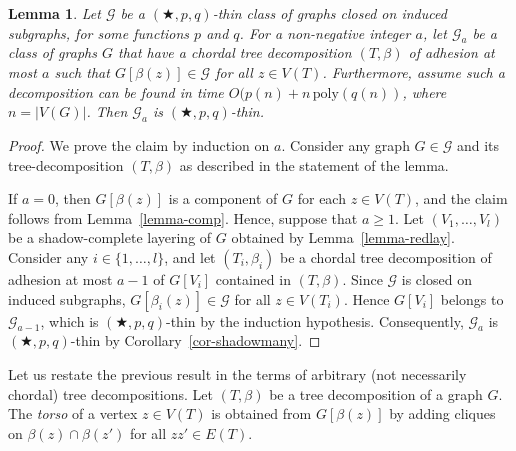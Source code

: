\documentclass[a4paper,11pt]{article}
\newcommand{\GG}{{\mathcal G}}
\newcommand{\poly}{\text{poly}}
\newtheorem{lemma}[theorem]{Lemma}
\begin{document}
\begin{lemma}\label{lemma-cliquesum}
Let $\GG$ be a $(\bigstar,p,q)$-thin class of graphs closed on induced subgraphs, for some functions $p$ and $q$.
For a non-negative integer $a$, let $\GG_a$ be a class of graphs $G$ that have a chordal tree decomposition $(T,\beta)$ of adhesion at most $a$
such that $G[\beta(z)]\in\GG$ for all $z\in V(T)$.
Furthermore, assume such a decomposition can be found in time $O(p(n)+n\,\poly(q(n))$, where $n=|V(G)|$.
Then $\GG_a$ is $(\bigstar,p,q)$-thin.
\end{lemma}
\begin{proof}
We prove the claim by induction on $a$.  Consider any graph $G\in\GG$ and its tree-decomposition $(T,\beta)$ as
described in the statement of the lemma.

If $a=0$, then $G[\beta(z)]$ is a component of $G$ for each $z\in V(T)$, and the claim
follows from Lemma~\ref{lemma-comp}.  Hence, suppose that $a\ge 1$.  Let $(V_1,\ldots, V_l)$ be a shadow-complete
layering of $G$ obtained by Lemma~\ref{lemma-redlay}.  Consider any $i\in\{1,\ldots,l\}$, and let $(T_i,\beta_i)$
be a chordal tree decomposition of adhesion at most $a-1$ of $G[V_i]$ contained in $(T,\beta)$.
Since $\GG$ is closed on induced subgraphs, $G[\beta_i(z)]\in\GG$ for all $z\in V(T_i)$.  Hence $G[V_i]$ belongs to
$\GG_{a-1}$, which is $(\bigstar,p,q)$-thin by the induction hypothesis.  Consequently, $\GG_a$ is
$(\bigstar,p,q)$-thin by Corollary~\ref{cor-shadowmany}.
\end{proof}

Let us restate the previous result in the terms of arbitrary (not necessarily chordal) tree decompositions.
Let $(T,\beta)$ be a tree decomposition of a graph $G$.  The \emph{torso} of a vertex $z\in V(T)$ is obtained from $G[\beta(z)]$ by
adding cliques on $\beta(z)\cap\beta(z')$ for all $zz'\in E(T)$.
\end{document}
